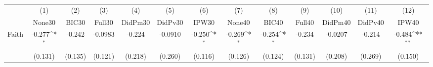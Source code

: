 {
\def\sym#1{\ifmmode^{#1}\else\(^{#1}\)\fi}
\begin{tabular}{l*{12}{c}}
\toprule
            &\multicolumn{1}{c}{(1)}&\multicolumn{1}{c}{(2)}&\multicolumn{1}{c}{(3)}&\multicolumn{1}{c}{(4)}&\multicolumn{1}{c}{(5)}&\multicolumn{1}{c}{(6)}&\multicolumn{1}{c}{(7)}&\multicolumn{1}{c}{(8)}&\multicolumn{1}{c}{(9)}&\multicolumn{1}{c}{(10)}&\multicolumn{1}{c}{(11)}&\multicolumn{1}{c}{(12)}\\
            &\multicolumn{1}{c}{None30}&\multicolumn{1}{c}{BIC30}&\multicolumn{1}{c}{Full30}&\multicolumn{1}{c}{DidPm30}&\multicolumn{1}{c}{DidPv30}&\multicolumn{1}{c}{IPW30}&\multicolumn{1}{c}{None40}&\multicolumn{1}{c}{BIC40}&\multicolumn{1}{c}{Full40}&\multicolumn{1}{c}{DidPm40}&\multicolumn{1}{c}{DidPv40}&\multicolumn{1}{c}{IPW40}\\
\midrule
Faith       &      -0.277\sym{*}  &      -0.242         &     -0.0983         &      -0.224         &     -0.0910         &      -0.250\sym{*}  &      -0.269\sym{*}  &      -0.254\sym{*}  &      -0.234         &     -0.0207         &      -0.214         &      -0.484\sym{**} \\
            &     (0.131)         &     (0.135)         &     (0.121)         &     (0.218)         &     (0.260)         &     (0.116)         &     (0.126)         &     (0.124)         &     (0.131)         &     (0.208)         &     (0.269)         &     (0.150)         \\
\bottomrule
\end{tabular}
}
